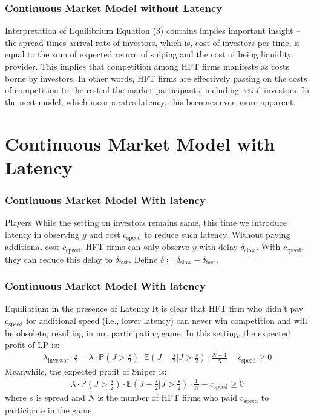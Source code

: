 \documentclass{beamer}
\begin{document}
\begin{frame}
    \frametitle{Continuous Market Model without Latency}
    \begin{block}{Interpretation of Equilibrium}
    Equation (3) contains implies important insight -- the spread times arrival rate of investors, which is, cost of investors per time, is equal to the sum of expected return of sniping and the cost of being liquidity provider. This implies that competition among HFT firms manifests as costs borne by investors. In other words, HFT firms are effectively passing on the costs of competition to the rest of the market participants, including retail investors. In the next model, which incorporates latency, this becomes even more apparent.
    \end{block}
\end{frame}

\section{Continuous Market Model with Latency}

\begin{frame}
    \frametitle{Continuous Market Model With latency} 
    \begin{block}{Players}
        While the setting on investors remains same, this time we introduce latency in observing $y$ and cost $c_\text{speed}$ to reduce such latency. Without paying additional cost $c_\text{speed}$, HFT firms can only observe $y$ with delay $\delta_\text{slow}$. With $c_\text{speed}$, they can reduce this delay to $\delta_\text{fast}$. Define $\delta \coloneq \delta_\text{slow} - \delta_\text{fast}$.
    \end{block}
\end{frame}

\begin{frame}
    \frametitle{Continuous Market Model With latency}
    \begin{block}{Equilibrium in the presence of Latency}
        It is clear that HFT firm who didn't pay $c_\text{speed}$ for additional speed (i.e., lower latency) can never win competition and will be obsolete, resulting in not participating game. In this setting, the expected profit of LP is: 
        \begin{align}
            \lambda_\text{investor} \cdot \frac{s}{2} - \lambda \cdot \mathbb{P}(J > \frac{s}{2}) \cdot \mathbb{E}(J - \frac{s}{2} | J > \frac{s}{2}) \cdot \frac{N-1}{N} - c_\text{speed} \geq 0
        \end{align}
        Meanwhile, the expected profit of Sniper is: 
        \begin{align}
            \lambda \cdot \mathbb{P}(J > \frac{s}{2}) \cdot \mathbb{E}(J - \frac{s}{2} | J > \frac{s}{2}) \cdot \frac{1}{N} - c_\text{speed} \geq 0
        \end{align}
        where $s$ is spread and $N$ is the number of HFT firms who paid $c_\text{speed}$ to participate in the game.
    \end{block}
\end{frame}
\end{document}
